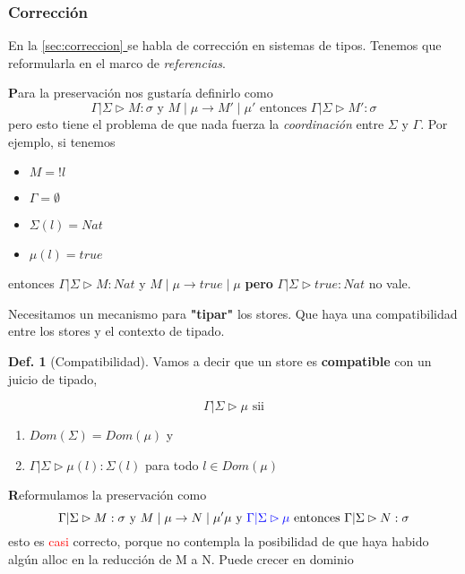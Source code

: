 \documentclass{report}
\newcommand*{\fullref}[1]{\hyperref[{#1}]{\autoref*{#1} \nameref*{#1}}}
\theoremstyle{definition} %
\newtheorem{definition}{Def.}[chapter]
\newenvironment{nota}[1]
    {\begin{leftbar}\textbf{#1}}
    {\end{leftbar}}
\newcommand{\tipa}[3]{#1 \rhd #2 : #3} %
\newcommand{\GStipa}[2]{\tipa{\Gamma|\Sigma}{#1}{#2}}
\newcommand{\compat}[2]{#1 \rhd #2} %
\newcommand{\GSCompat}[1]{\compat{\Gamma|\Sigma}{#1}} %
\newcommand{\dealloc}[1]{!#1}
\newcommand{\memat}[2]{#1(#2)}
\newcommand{\sreduce}[4]{\reduce{#1\mid#2}{#3\mid#4}}
\newcommand{\sreduceToPrime}[2]{\sreduce{#1}{#2}{#1'}{#2'}}
\newcommand{\reduce}[2]{#1 \to #2}
\newcommand{\changed}[1]{\textcolor{red}{#1}}
\newcommand{\select}[1]{\textcolor{blue}{#1}}
\begin{document}
\subsubsection{Corrección}

En la \fullref{sec:correccion} se habla de corrección en sistemas de tipos.
Tenemos que reformularla en el marco de \textit{referencias}.

\begin{nota}
    Para la preservación nos gustaría definirlo como 
    \[
        \GStipa{M}{\sigma}
        \text{ y } \sreduceToPrime{M}{\mu}
        \text{ entonces } \GStipa{M'}{\sigma}
    \]
    pero esto tiene el problema de que nada fuerza la \textit{coordinación}
    entre $\Sigma$ y $\Gamma$. Por ejemplo, si tenemos

    \begin{itemize}
        \item $M = \dealloc{l}$
        \item $\Gamma = \emptyset$
        \item $\Sigma(l) = Nat$
        \item $\mu(l) = true$
    \end{itemize}

    entonces $\GStipa{M}{Nat}$ y $\sreduce{M}{\mu}{true}{\mu}$ \textbf{pero}
    $\GStipa{true}{Nat}$ no vale.

    Necesitamos un mecanismo para \textbf{"tipar"} los stores. Que haya una
    compatibilidad entre los stores y el contexto de tipado.
\end{nota}

\begin{definition}[Compatibilidad]
    
    Vamos a decir que un store es \textbf{compatible} con un juicio de tipado,

    \[\GSCompat{\mu} \text{ sii}\]
    \begin{enumerate}
        \item $Dom(\Sigma) = Dom(\mu)$ y
        \item $\GStipa{\memat{\mu}{l}}{\Sigma(l)}$ para todo $l \in Dom(\mu)$
    \end{enumerate}

\end{definition}

\begin{nota}
    Reformulamos la preservación como
    \[
        \GStipa{M}{\sigma}
        \text{ y } \sreduce{M}{\mu}{N}{\mu'}{\mu}
        \text{ y } \select{\GSCompat{\mu}}
        \text{ entonces } \GStipa{N}{\sigma}
    \]
    esto es \changed{casi} correcto, porque no contempla la posibilidad de que
    haya habido algún alloc en la reducción de M a N. Puede crecer en dominio
\end{nota}
\end{document}
